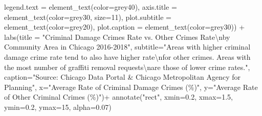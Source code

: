 \documentclass[
]{report}
\newenvironment{Shaded}{}{}
\newcommand{\AttributeTok}[1]{\textcolor[rgb]{0.65,0.15,0.64}{#1}}
\newcommand{\DecValTok}[1]{\textcolor[rgb]{0.60,0.41,0.00}{#1}}
\newcommand{\FloatTok}[1]{\textcolor[rgb]{0.60,0.41,0.00}{#1}}
\newcommand{\FunctionTok}[1]{\textcolor[rgb]{0.25,0.47,0.95}{#1}}
\newcommand{\NormalTok}[1]{\textcolor[rgb]{0.22,0.23,0.26}{#1}}
\newcommand{\SpecialCharTok}[1]{\textcolor[rgb]{0.00,0.52,0.74}{#1}}
\newcommand{\StringTok}[1]{\textcolor[rgb]{0.31,0.63,0.31}{#1}}
\begin{document}
\begin{Shaded}
\begin{Highlighting}[]
        \AttributeTok{legend.text =} \FunctionTok{element\_text}\NormalTok{(}\AttributeTok{color=}\StringTok{\textquotesingle{}grey40\textquotesingle{}}\NormalTok{),}
        \AttributeTok{axis.title =} \FunctionTok{element\_text}\NormalTok{(}\AttributeTok{color=}\StringTok{\textquotesingle{}grey30\textquotesingle{}}\NormalTok{, }\AttributeTok{size=}\DecValTok{11}\NormalTok{),}
        \AttributeTok{plot.subtitle =} \FunctionTok{element\_text}\NormalTok{(}\AttributeTok{color=}\StringTok{\textquotesingle{}grey20\textquotesingle{}}\NormalTok{),}
        \AttributeTok{plot.caption =} \FunctionTok{element\_text}\NormalTok{(}\AttributeTok{color=}\StringTok{\textquotesingle{}grey30\textquotesingle{}}\NormalTok{)) }\SpecialCharTok{+}
  \FunctionTok{labs}\NormalTok{(}\AttributeTok{title =} \StringTok{"Criminal Damage Crimes Rate vs. Other Crimes Rate}\SpecialCharTok{\textbackslash{}n}\StringTok{by Community Area in Chicago 2016{-}2018"}\NormalTok{,}
       \AttributeTok{subtitle=}\StringTok{"Areas with higher criminal damage crime rate tend to also have higher rate}\SpecialCharTok{\textbackslash{}n}\StringTok{for other crimes. Areas with the most number of graffiti removal requests}\SpecialCharTok{\textbackslash{}n}\StringTok{are those of lower crime rates."}\NormalTok{,}
       \AttributeTok{caption=}\StringTok{"Source: Chicago Data Portal \& Chicago Metropolitan Agency for Planning"}\NormalTok{,}
       \AttributeTok{x=}\StringTok{"Average Rate of Criminal Damage Crimes (\%)"}\NormalTok{,}
       \AttributeTok{y=}\StringTok{"Average Rate of Other Criminal Crimes (\%)"}\NormalTok{)}\SpecialCharTok{+}
  \FunctionTok{annotate}\NormalTok{(}\StringTok{"rect"}\NormalTok{, }\AttributeTok{xmin=}\FloatTok{0.2}\NormalTok{, }\AttributeTok{xmax=}\FloatTok{1.5}\NormalTok{, }\AttributeTok{ymin=}\FloatTok{0.2}\NormalTok{, }\AttributeTok{ymax=}\DecValTok{15}\NormalTok{, }\AttributeTok{alpha=}\FloatTok{0.07}\NormalTok{)}
\end{Highlighting}
\end{Shaded}
\end{document}
